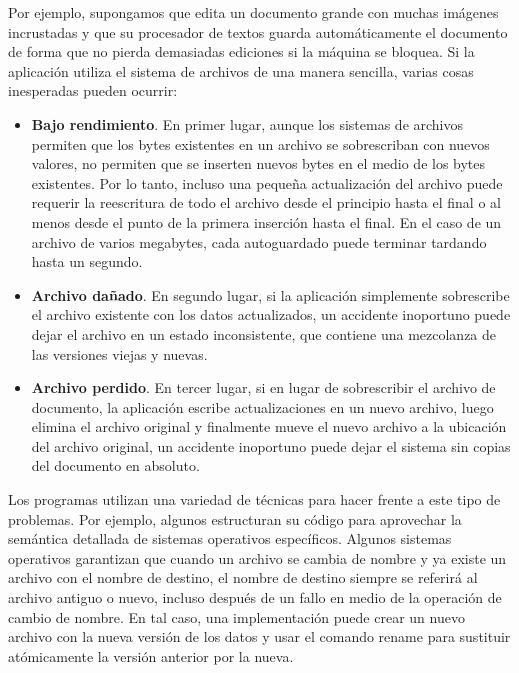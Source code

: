 \documentclass[10pt]{book}
\begin{document}
Por ejemplo, supongamos que edita un documento grande con muchas imágenes incrustadas y que su procesador de textos guarda automáticamente el documento de forma que no pierda demasiadas ediciones si la máquina se bloquea. Si la aplicación utiliza el sistema de archivos de una manera sencilla, varias cosas inesperadas pueden ocurrir:

\begin{itemize}
\item \textbf{Bajo rendimiento}. En primer lugar, aunque los sistemas de archivos permiten que los bytes existentes en un archivo se sobrescriban con nuevos valores, no permiten que se inserten nuevos bytes en el medio de los bytes existentes. Por lo tanto, incluso una pequeña actualización del archivo puede requerir la reescritura de todo el archivo desde el principio hasta el final o al menos desde el punto de la primera inserción hasta el final. En el caso de un archivo de varios megabytes, cada autoguardado puede terminar tardando hasta un segundo.

\item \textbf{Archivo dañado}. En segundo lugar, si la aplicación simplemente sobrescribe el archivo existente con los datos actualizados, un accidente inoportuno puede dejar el archivo en un estado inconsistente, que contiene una mezcolanza de las versiones viejas y nuevas.

\item \textbf{Archivo perdido}. En tercer lugar, si en lugar de sobrescribir el archivo de documento, la aplicación escribe actualizaciones en un nuevo archivo, luego elimina el archivo original y finalmente mueve el nuevo archivo a la ubicación del archivo original, un accidente inoportuno puede dejar el sistema sin copias del documento en absoluto.
\end{itemize}

Los programas utilizan una variedad de técnicas para hacer frente a este tipo de problemas. Por ejemplo, algunos estructuran su código para aprovechar la semántica detallada de sistemas operativos específicos. Algunos sistemas operativos garantizan que cuando un archivo se cambia de nombre y ya existe un archivo con el nombre de destino, el nombre de destino siempre se referirá al archivo antiguo o nuevo, incluso después de un fallo en medio de la operación de cambio de nombre. En tal caso, una implementación puede crear un nuevo archivo con la nueva versión de los datos y usar el comando rename para sustituir atómicamente la versión anterior por la nueva.
\end{document}
